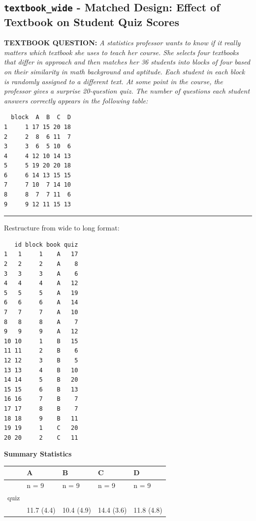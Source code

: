 \documentclass[]{article}
\begin{document}
\clearpage

\subsection{\texorpdfstring{\texttt{textbook\_wide} - Matched Design:
Effect of Textbook on Student Quiz
Scores}{textbook\_wide - Matched Design: Effect of Textbook on Student Quiz Scores}}\label{textbook_wide---matched-design-effect-of-textbook-on-student-quiz-scores}

\textbf{TEXTBOOK QUESTION:} \emph{A statistics professor wants to know
if it really matters which textbook she uses to teach her course. She
selects four textbooks that differ in approach and then matches her 36
students into blocks of four based on their similarity in math
background and aptitude. Each student in each block is randomly assigned
to a different text. At some point in the course, the professor gives a
surprise 20-question quiz. The number of questions each student answers
correctly appears in the following table:}

\begin{verbatim}
  block  A  B  C  D
1     1 17 15 20 18
2     2  8  6 11  7
3     3  6  5 10  6
4     4 12 10 14 13
5     5 19 20 20 18
6     6 14 13 15 15
7     7 10  7 14 10
8     8  7  7 11  6
9     9 12 11 15 13
\end{verbatim}

\begin{center}\rule{0.5\linewidth}{\linethickness}\end{center}

Restructure from wide to long format:

\begin{verbatim}
   id block book quiz
1   1     1    A   17
2   2     2    A    8
3   3     3    A    6
4   4     4    A   12
5   5     5    A   19
6   6     6    A   14
7   7     7    A   10
8   8     8    A    7
9   9     9    A   12
10 10     1    B   15
11 11     2    B    6
12 12     3    B    5
13 13     4    B   10
14 14     5    B   20
15 15     6    B   13
16 16     7    B    7
17 17     8    B    7
18 18     9    B   11
19 19     1    C   20
20 20     2    C   11
\end{verbatim}

\clearpage

\textbf{Summary Statistics}

\begin{longtable}[]{@{}lllll@{}}
\toprule
& A & B & C & D\tabularnewline
\midrule
\endhead
& n = 9 & n = 9 & n = 9 & n = 9\tabularnewline
quiz & & & &\tabularnewline
& 11.7 (4.4) & 10.4 (4.9) & 14.4 (3.6) & 11.8 (4.8)\tabularnewline
\bottomrule
\end{longtable}
\end{document}
